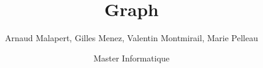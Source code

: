 \documentclass{beamer}
\title{Graph}
\author[]{Arnaud Malapert, Gilles Menez, Valentin Montmirail, Marie Pelleau}
\date[2018 - 2019]{Master Informatique}
\begin{document}
\frame{
  \titlepage
}
\end{document}
